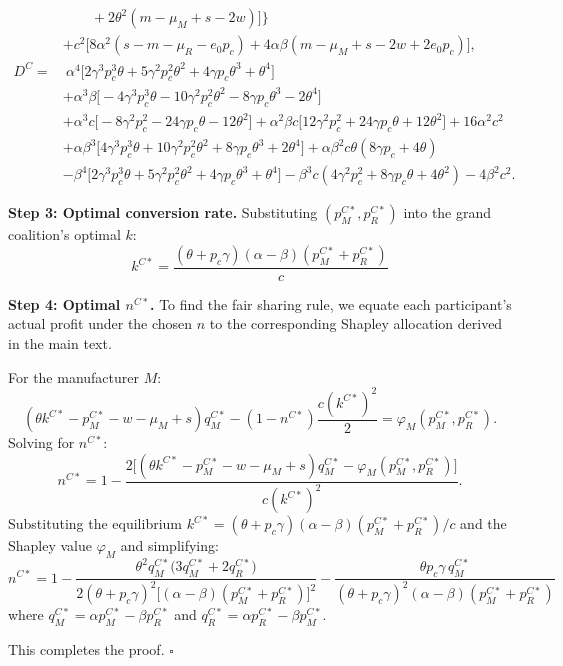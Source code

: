 \documentclass[authoryear,preprint,review,times,10pt]{elsarticle}
\begin{document}
\begin{equation}
\begin{aligned}
&\qquad + 2\theta^{2}(m - \mu_{M} + s - 2w)\big] \big\} \\
&+ c^{2}\big[8\alpha^{2}(s - m - \mu_{R} - e_{0} p_{c}) + 4\alpha\beta(m - \mu_{M} + s - 2w + 2e_{0} p_{c})\big], \\[3pt]
D^{C} =&\ \alpha^{4}\big[2\gamma^{3} p_{c}^{3}\theta + 5\gamma^{2} p_{c}^{2}\theta^{2} + 4\gamma p_{c}\theta^{3} + \theta^{4}\big] \\
&+ \alpha^{3}\beta\big[-4\gamma^{3} p_{c}^{3}\theta - 10\gamma^{2} p_{c}^{2}\theta^{2} - 8\gamma p_{c}\theta^{3} - 2\theta^{4}\big] \\
&+ \alpha^{3} c\big[-8\gamma^{2} p_{c}^{2} - 24\gamma p_{c}\theta - 12\theta^{2}\big] + \alpha^{2}\beta c\big[12\gamma^{2} p_{c}^{2} + 24\gamma p_{c}\theta + 12\theta^{2}\big] + 16\alpha^{2} c^{2} \\
&+ \alpha\beta^{3}\big[4\gamma^{3} p_{c}^{3}\theta + 10\gamma^{2} p_{c}^{2}\theta^{2} + 8\gamma p_{c}\theta^{3} + 2\theta^{4}\big] + \alpha\beta^{2} c\theta(8\gamma p_{c} + 4\theta) \\
&- \beta^{4}\big[2\gamma^{3} p_{c}^{3}\theta + 5\gamma^{2} p_{c}^{2}\theta^{2} + 4\gamma p_{c}\theta^{3} + \theta^{4}\big] - \beta^{3} c(4\gamma^{2} p_{c}^{2} + 8\gamma p_{c}\theta + 4\theta^{2}) - 4\beta^{2} c^{2}.
\end{aligned}
\end{equation}

\textbf{Step 3: Optimal conversion rate.} Substituting $(p_M^{C*}, p_R^{C*})$ into the grand coalition's optimal $k$:
\begin{equation}
k^{C*} = \frac{(\theta + p_c \gamma)(\alpha - \beta)(p_M^{C*} + p_R^{C*})}{c}
\tag{D2}
\end{equation}

\textbf{Step 4: Optimal $n^{C*}$.}  To find the fair sharing rule, we equate each participant's actual profit under the chosen $n$ to the corresponding Shapley allocation derived in the main text.

For the manufacturer $M$:
\begin{equation}
(\theta k^{C*} - p_M^{C*} - w - \mu_M + s)q_M^{C*} - (1 - n^{C*})\frac{c (k^{C*})^{2}}{2} = \varphi_M(p_M^{C*}, p_R^{C*}).
\end{equation}
Solving for $n^{C*}$:
\begin{equation}
n^{C*} = 1 - \frac{2\big[(\theta k^{C*} - p_M^{C*} - w - \mu_M + s)q_M^{C*} - \varphi_M(p_M^{C*}, p_R^{C*})\big]}{c (k^{C*})^{2}}.
\end{equation}
Substituting the equilibrium $k^{C*} = (\theta + p_c \gamma)(\alpha - \beta)(p_M^{C*} + p_R^{C*})/c$ and the Shapley value $\varphi_M$ and simplifying:
\begin{equation}
n^{C*} = 1 - \frac{\theta^{2} q_M^{C*}\big(3 q_M^{C*} + 2 q_R^{C*}\big)}{2(\theta + p_c \gamma)^{2} \big[(\alpha-\beta)(p_M^{C*} + p_R^{C*})\big]^{2}} - \frac{\theta p_c \gamma \, q_M^{C*}}{(\theta + p_c \gamma)^{2} (\alpha-\beta)(p_M^{C*} + p_R^{C*})}
\tag{D3}
\end{equation}
where $q_M^{C*} = \alpha p_M^{C*} - \beta p_R^{C*}$ and $q_R^{C*} = \alpha p_R^{C*} - \beta p_M^{C*}$. 

This completes the proof. \hfill $\square$
\end{document}
